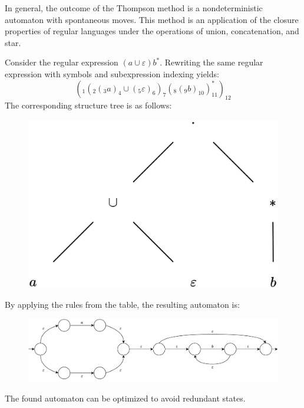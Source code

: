 In general, the outcome of the Thompson method is a nondeterministic automaton with spontaneous moves. 
This method is an application of the closure properties of regular languages under the operations of union, concatenation, and star.
\begin{example}
    Consider the regular expression $(a \cup \varepsilon)b^{*}$. 
    Rewriting the same regular expression with symbols and subexpression indexing yields:
    \[\left(_1\left(_2\left(_3a\right)_4 \cup \left(_5\varepsilon\right)_6\right)_7\left(_8\left(_9b\right)_{10}\right)_{11}^{*}\right)_{12}\]
    The corresponding structure tree is as follows:
    \begin{figure}[H]
        \centering
        \includegraphics[width=0.35\linewidth]{images/st.png}
    \end{figure}
    By applying the rules from the table, the resulting automaton is:
    \begin{figure}[H]
        \centering
        \includegraphics[width=0.75\linewidth]{images/at.png}
    \end{figure}
    The found automaton can be optimized to avoid redundant states.
\end{example}

